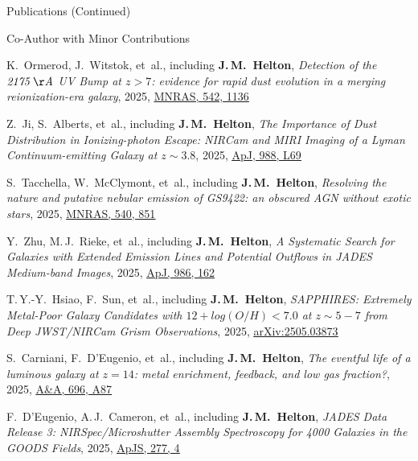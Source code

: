 \documentclass{JMH_CV}
\begin{document}
\begin{rSection}{Publications (Continued)}
\begin{rSubsection}{Co-Author with Minor Contributions}{}{}{}
\begin{etaremune}
    \item K.~Ormerod, J.~Witstok, et~al., including \textbf{J.\,M.~Helton}, \textit{Detection of the $\mathit{2175\,\AA}$ UV Bump at $\mathit{z > 7}$: evidence for rapid dust evolution in a merging reionization-era galaxy}, 2025, \href{https://www.scixplorer.org/abs/2025MNRAS.542.1136O/abstract}{\ul{MNRAS, 542, 1136}}

    \item Z.~Ji, S.~Alberts, et~al., including \textbf{J.\,M.~Helton}, \textit{The Importance of Dust Distribution in Ionizing-photon Escape: NIRCam and MIRI Imaging of a Lyman Continuum-emitting Galaxy at $\mathit{z \sim 3.8}$}, 2025, \href{https://www.scixplorer.org/abs/2025ApJ...988L..69J/abstract}{\ul{ApJ, 988, L69}}

    \item S.~Tacchella, W.~McClymont, et~al., including \textbf{J.\,M.~Helton}, \textit{Resolving the nature and putative nebular emission of GS9422: an obscured AGN without exotic stars}, 2025, \href{https://www.scixplorer.org/abs/2025MNRAS.540..851T/abstract}{\ul{MNRAS, 540, 851}}

    \item Y.~Zhu, M.\,J.~Rieke, et~al., including \textbf{J.\,M.~Helton}, \textit{A Systematic Search for \mbox{Galaxies} with Extended Emission Lines and Potential Outflows in JADES Medium-band \mbox{Images}}, 2025, \href{https://www.scixplorer.org/abs/2025ApJ...986..162Z/abstract}{\ul{ApJ, 986, 162}}

    \item T.\,Y.-Y.~Hsiao, F.~Sun, et~al., including \textbf{J.\,M.~Helton}, \textit{SAPPHIRES: Extremely Metal-Poor Galaxy Candidates with $\mathit{12 + log\left( O/H \right) < 7.0}$ at $\mathit{z \sim 5-7}$ from Deep JWST/NIRCam Grism Observations}, 2025, \href{https://www.scixplorer.org/abs/2025arXiv250503873H/abstract}{\ul{arXiv:2505.03873}}

    \item S.~Carniani, F.~D'Eugenio, et~al., including \textbf{J.\,M.~Helton}, \textit{The eventful life of a luminous galaxy at $\mathit{z = 14}$: metal enrichment, feedback, and low gas fraction?}, 2025, \href{https://www.scixplorer.org/abs/2025A&A...696A..87C/abstract}{\ul{A\&A, 696, A87}}

    \item F.~D'Eugenio, A.\,J.~Cameron, et~al., including \textbf{J.\,M.~Helton}, \textit{JADES Data Release 3: NIRSpec/Microshutter Assembly Spectroscopy for 4000 Galaxies in the GOODS Fields}, 2025, \href{https://www.scixplorer.org/abs/2025ApJS..277....4D/abstract}{\ul{ApJS, 277, 4}}


\end{etaremune}
\end{rSubsection}
\end{rSection}
\end{document}
